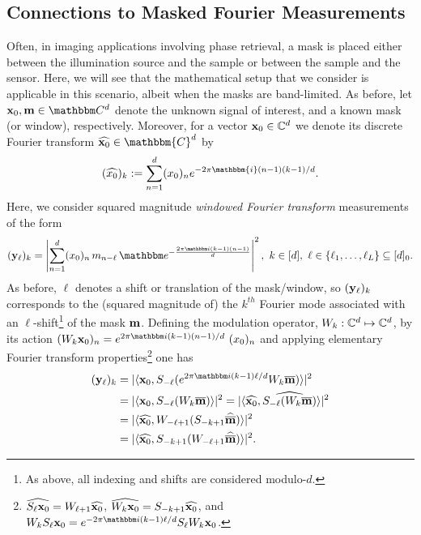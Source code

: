\subsection{Connections to Masked Fourier Measurements}
\label{sec:STFT}
%
%
Often, in imaging applications involving phase retrieval, a mask is placed either between the illumination source and the sample or between the sample and the sensor. Here, we will see that the mathematical setup that we consider is applicable in this scenario, albeit when the masks are band-limited.  As before, let $\x_0, \m \in \mathbbm C^d$ denote the unknown signal of
interest, and a known mask (or window), respectively. Moreover, for a vector $\mathbf x_0 \in \mathbb{C}^d$ we denote its discrete Fourier transform $\widehat{\x_0} \in \mathbbm{C}^d$ by $$(\widehat{x_0})_k :=\sum_{n=1}^d (x_0)_n e^{-2\pi \mathbbm{i} (n-1)(k-1)/d}.$$  Here, we consider squared magnitude \emph{windowed Fourier
transform} measurements of the form 
%
\begin{equation}
  ({\y_\ell})_k = \left \vert \sum_{n=1}^d (x_0)_n \, m_{n-\ell} \,
      \mathbbm e^{-\frac{2\pi \mathbbm i (k-1) (n-1)}d} 
      \right \vert^2, ~ k \in [d],
      ~ \ell \in \{\ell_1, \dots, \ell_L\} \subset 
        [d]_0.
  \label{eq:STFT_measurements}
\end{equation}
%
As before, $\ell$ denotes a shift or translation of the mask/window, so
 $({\mathbf y_\ell})_k$ corresponds to the (squared magnitude of) the
$k^{th}$ Fourier mode associated with an
$\ell$-shift\footnote{As above, all indexing and shifts are considered
modulo-$d$.} of the mask $\mathbf m$. Defining the modulation operator, $W_k: \mathbb{C}^d \mapsto \mathbb{C}^d$,  by its action $(W_k \x_0)_n = e^{2\pi \mathbbm i (k-1)(n-1)/d}~(x_0)_n$ and applying elementary Fourier transform properties\footnote{$\widehat{S_\ell \mathbf x_0}=W_{\ell+1}\widehat{\mathbf x_0}$, $\widehat{W_k \mathbf x_0}=S_{-k+1}\widehat{\mathbf x_0}$, and $W_k S_\ell \x_0 = e^{-2\pi \mathbbm i (k-1)\ell/d} S_\ell W_k \x_0$.}
 one has
%
\begin{align}
    (\y_\ell)_k &=  \lvert \langle  \x_0, S_{-\ell}(e^{2\pi \mathbbm i (k-1)\ell/d}W_k\overline{\m} )\rangle \rvert^2 \notag \\
       & =  \lvert \langle  \x_0, S_{-\ell}(W_k \overline{\m} )\rangle \rvert^2 \notag 
       =  \lvert \langle  \widehat{\x_0}, \widehat{S_{-\ell}(W_{k} \overline{\m} )}\rangle \rvert^2 \notag \\
       & = \lvert \langle  \widehat{\x_0}, W_{-\ell+1}(S_{-k+1}\widehat{\overline{\m}} )\rangle \rvert^2 \notag \\ 
       &=\lvert \langle  \widehat{\x_0}, S_{-k+1}(W_{-\ell+1}\widehat{\overline{\m}} )\rangle \rvert^2.
       \end{align}

